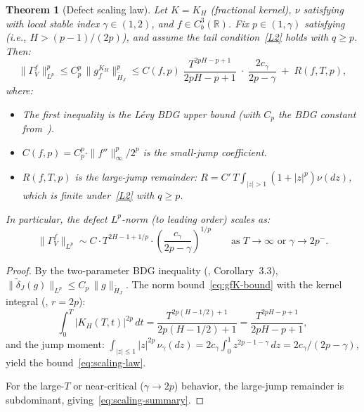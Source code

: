 \documentclass[11pt,a4paper]{article}
\theoremstyle{plain}
\newtheorem{theorem}{Theorem}[section]
\theoremstyle{definition}
\theoremstyle{remark}
\newcommand{\R}{\mathbb{R}}
\begin{document}
\begin{theorem}[Defect scaling law]\label{thm:scaling}
Let $K = K_H$ (fractional kernel), $\nu$ satisfying
 with local stable index $\gamma \in (1,2)$,
and $f \in C_b^3(\R)$.  Fix $p \in (1,\gamma)$ satisfying
 (i.e., $H > (p-1)/(2p)$), and assume the
tail condition~\ref{L2} holds with $q \geq p$.  Then:
\begin{equation}\label{eq:scaling-law}
  \|\Gamma_V^f\|_{L^p}^p
  \leq C_p^p\,\|g_f^{K_H}\|_{\widetilde{H}_J}^p
  \leq C(f,p)\;\frac{T^{2pH - p + 1}}{2pH - p + 1}
  \;\cdot\;\frac{2c_\gamma}{2p - \gamma}
  \;+\; R(f,T,p),
\end{equation}
where:
\begin{itemize}
\item The first inequality is the L\'evy BDG upper bound
  (with $C_p$ the BDG constant from~\cite{Dirksen2015}).
\item $C(f,p) = C_p^p \cdot \|f''\|_\infty^p / 2^p$
  is the small-jump coefficient.
\item $R(f,T,p)$ is the large-jump remainder:
  $R = C'\,T\!\int_{|z|>1}(1+|z|^p)\nu(dz)$, which is
  finite under~\ref{L2} with $q \geq p$.
\end{itemize}
In particular, the defect $L^p$-norm (to leading order) scales as:
\begin{equation}\label{eq:scaling-summary}
  \|\Gamma_V^f\|_{L^p}
  \sim C \cdot T^{2H - 1 + 1/p}
  \cdot \left(\frac{c_\gamma}{2p - \gamma}\right)^{1/p}
  \qquad \text{as } T \to \infty \text{ or } \gamma \to 2p^-.
\end{equation}
\end{theorem}

\begin{proof}
By the two-parameter BDG inequality (\cite{Dirksen2015},
Corollary~3.3),
$\|\widetilde{\delta}_J(g)\|_{L^p} \leq
C_p\,\|g\|_{\widetilde{H}_J}$.
The norm bound~\eqref{eq:gfK-bound} with the kernel integral
(, $r = 2p$):
\[
  \int_0^T |K_H(T,t)|^{2p}\,dt
  = \frac{T^{2p(H-1/2)+1}}{2p(H-1/2)+1}
  = \frac{T^{2pH - p + 1}}{2pH - p + 1},
\]
and the jump moment:
$\int_{|z|\leq 1}|z|^{2p}\,\nu_\gamma(dz)
= 2c_\gamma\int_0^1 z^{2p-1-\gamma}\,dz
= 2c_\gamma/(2p - \gamma)$,
yield the bound~\eqref{eq:scaling-law}.

For the large-$T$ or near-critical ($\gamma \to 2p$) behavior,
the large-jump remainder is subdominant, giving~\eqref{eq:scaling-summary}.
\end{proof}
\end{document}
